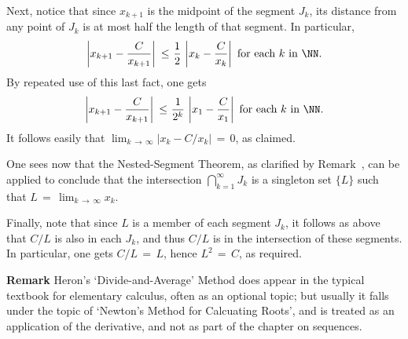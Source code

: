         Next, notice that since $x_{k+1}$ is the midpoint of the segment $J_{k}$,
    its distance from any point of $J_{k}$ is at most half the length of that segment.
    In particular,
        \begin{displaymath}
        \left|x_{k+1} - \frac{C}{x_{k+1}}\right|\,\,{\leq}\,\,\frac{1}{2}\,\left|x_{k}-\frac{C}{x_{k}}\right| \mbox{ for each $k$ in ${\NN}$}.
        \end{displaymath}
    By repeated use of this last fact, one gets
        \begin{displaymath}
        \left|x_{k+1} - \frac{C}{x_{k+1}}\right|\,\,{\leq}\,\,\frac{1}{2^{k}}\,\left|x_{1}-\frac{C}{x_{1}}\right| \mbox{ for each $k$ in ${\NN}$}.
        \end{displaymath}
    It follows easily that $\lim_{k \,{\rightarrow}\, {\infty}} \left|x_{k}-C/x_{k}\right| \,=\, 0$, as claimed.

        One sees now that the Nested-Segment Theorem, as clarified by Remark~, can be applied to conclude that the intersection
    ${\bigcap}_{k=1}^{{\infty}} J_{k}$ is a singleton set $\{L\}$ such that $L \,=\, \lim_{k \,{\rightarrow}\, {\infty}} x_{k}$.

    Finally, note that since $L$ is a member of each segment $J_{k}$, it follows as above that $C/L$ is also in each $J_{k}$,
    and thus $C/L$ is in the intersection of these segments. In particular, one gets $C/L \,=\, L$, hence $L^{2} \,=\, C$, as required.


\V

        {\bf Remark} Heron's `Divide-and-Average' Method does appear in the typical textbook for elementary calculus, often as an optional topic;
    but usually it falls under the topic of `Newton's Method for Calcuating Roots',
    and is treated as an application of the derivative, and not as part of the chapter on sequences.


\V
\V




